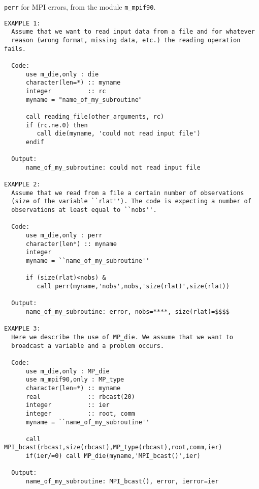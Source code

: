  {\tt perr} for MPI errors, from the module
   {\tt m\_mpif90}.
%
\begin{verbatim}
EXAMPLE 1:
  Assume that we want to read input data from a file and for whatever
  reason (wrong format, missing data, etc.) the reading operation fails.

  Code:
      use m_die,only : die
      character(len=*) :: myname
      integer          :: rc
      myname = "name_of_my_subroutine"
      
      call reading_file(other_arguments, rc)
      if (rc.ne.0) then
         call die(myname, 'could not read input file')
      endif

  Output:
      name_of_my_subroutine: could not read input file

EXAMPLE 2:
  Assume that we read from a file a certain number of observations
  (size of the variable ``rlat''). The code is expecting a number of
  observations at least equal to ``nobs''.

  Code:
      use m_die,only : perr
      character(len*) :: myname
      integer
      myname = ``name_of_my_subroutine''

      if (size(rlat)<nobs) &
         call perr(myname,'nobs',nobs,'size(rlat)',size(rlat))

  Output:
      name_of_my_subroutine: error, nobs=****, size(rlat)=$$$$

EXAMPLE 3:
  Here we describe the use of MP_die. We assume that we want to
  broadcast a variable and a problem occurs.
 
  Code:
      use m_die,only : MP_die
      use m_mpif90,only : MP_type
      character(len=*) :: myname
      real             :: rbcast(20)
      integer          :: ier
      integer          :: root, comm
      myname = ``name_of_my_subroutine''
      
      call MPI_bcast(rbcast,size(rbcast),MP_type(rbcast),root,comm,ier)
      if(ier/=0) call MP_die(myname,'MPI_bcast()',ier)

  Output:
      name_of_my_subroutine: MPI_bcast(), error, ierror=ier

\end{verbatim}
 
